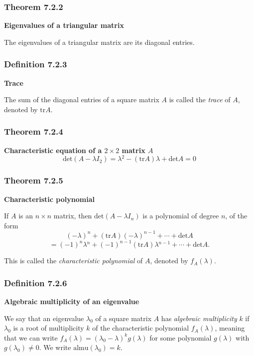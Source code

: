 \documentclass{report}
\begin{document}
\subsubsection*{Theorem 7.2.2}
\par\noindent\textbf{Eigenvalues of a triangular matrix}
\par\noindent The eigenvalues of a triangular matrix are its diagonal entries.
\subsubsection*{Definition 7.2.3}
\par\noindent\textbf{Trace}
\par\noindent The sum of the diagonal entries of a square matrix $A$ is called the \textit{trace} of $A$, denoted by $\textrm{tr}A$.
\subsubsection*{Theorem 7.2.4}
\par\noindent\textbf{Characteristic equation of a $2\times{}2$ matrix $A$}
\[\textrm{det}(A-\lambda{}I_{2})=\lambda{}^{2}-(\textrm{tr}A)\lambda{}+\textrm{det}A=0\]
\subsubsection*{Theorem 7.2.5}
\par\noindent\textbf{Characteristic polynomial}
\par\noindent If $A$ is an $n\times{}n$ matrix, then $\textrm{det}(A-\lambda{}I_{n})$ is a polynomial of degree $n$, of the form
\[(-\lambda{})^{n}+(\textrm{tr}A)(-\lambda{})^{n-1}+\cdots{}+\textrm{det}A\]
\[=(-1)^{n}\lambda{}^{n}+(-1)^{n-1}(\textrm{tr}A)\lambda{}^{n-1}+\cdots{}+\textrm{det}A.\]
\par\noindent This is called the \textit{characteristic polynomial} of $A$, denoted by $f_{A}(\lambda{})$.
\subsubsection*{Definition 7.2.6}
\par\noindent\textbf{Algebraic multiplicity of an eigenvalue}
\par\noindent We say that an eigenvalue $\lambda{}_{0}$ of a square matrix $A$ has \textit{algebraic multiplicity} $k$ if $\lambda{}_{0}$ is a root of multiplicity $k$ of the characteristic polynomial $f_{A}(\lambda{})$, meaning that we can write $f_{A}(\lambda{})=(\lambda{}_{0}-\lambda{})^{k}g(\lambda{})$ for some polynomial $g(\lambda{})$ with $g(\lambda{}_{0})\ne{}0$. We write $\textrm{almu}(\lambda{}_{0})=k$.
\end{document}
